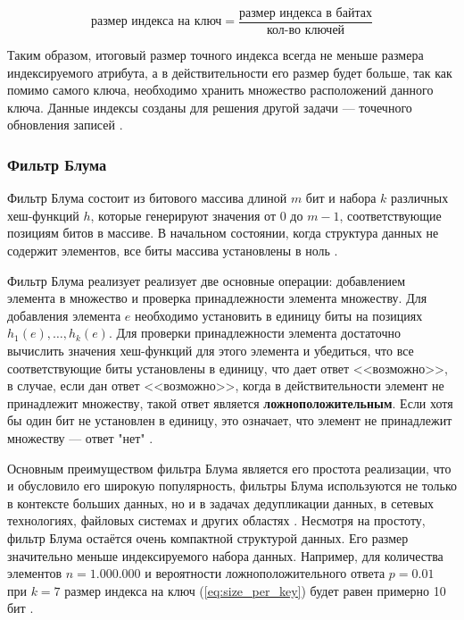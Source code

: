 \begin{equation}\label{eq:size_per_key}
    \textrm{размер индекса на ключ} = \frac{\textrm{размер индекса в байтах}}{\textrm{кол-во ключей}}
\end{equation}

Таким образом, итоговый размер точного индекса всегда не меньше размера индексируемого атрибута, а в действительности его размер будет больше, так как помимо самого ключа, необходимо хранить множество расположений данного ключа. Данные индексы созданы для решения другой задачи --- точечного обновления записей \cite{Hudi_RLI}.

\subsubsection{Фильтр Блума} 

Фильтр Блума состоит из битового массива длиной $m$ бит и набора $k$ различных хеш-функций $h$, которые генерируют значения от $0$ до $m−1$, соответствующие позициям битов в массиве. В начальном состоянии, когда структура данных не содержит элементов, все биты массива установлены в ноль \cite{Bloom_Filter}.

Фильтр Блума реализует реализует две основные операции: добавлением элемента в множество и проверка принадлежности элемента множеству. Для добавления элемента $e$ необходимо установить в единицу биты на позициях $h_1(e), \dots, h_k(e)$. Для проверки принадлежности элемента достаточно вычислить значения хеш-функций для этого элемента и убедиться, что все соответствующие биты установлены в единицу, что дает ответ {<<возможно>>}, в случае, если дан ответ {<<возможно>>}, когда в действительности элемент не принадлежит множеству, такой ответ является \textbf{ложноположительным}. Если хотя бы один бит не установлен в единицу, это означает, что элемент не принадлежит множеству — ответ "нет" \cite{Bloom_Filter,Role_of_bloom_filter_in_big_data}.

Основным преимуществом фильтра Блума является его простота реализации, что и обусловило его широкую популярность, фильтры Блума используются не только в контексте больших данных, но и в задачах дедупликации данных, в сетевых технологиях, файловых системах и других областях \cite{Role_of_bloom_filter_in_big_data}. Несмотря на простоту, фильтр Блума остаётся очень компактной структурой данных. Его размер значительно меньше индексируемого набора данных. Например, для количества элементов $n = 1.000.000$ и вероятности ложноположительного ответа $p = 0.01$ при $k = 7$ размер индекса на ключ (\ref{eq:size_per_key}) будет равен примерно 10 бит \cite{Bloom_Filter}.

